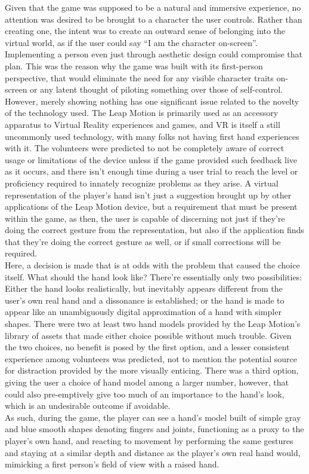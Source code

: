    Given that the game was supposed to be a natural and immersive experience, no attention was desired to be brought to a character the user controls. Rather than creating one, the intent was to create an outward sense of belonging into the virtual world, as if the user could say “I am the character on-screen”. Implementing a person even just through aesthetic design could compromise that plan. This was the reason why the game was built with its first-person perspective, that would eliminate the need for any visible character traits on-screen or any latent thought of piloting something over those of self-control.\\
    However, merely showing nothing has one significant issue related to the novelty of the technology used. The Leap Motion is primarily used as an accessory apparatus to Virtual Reality experiences and games, and VR is itself a still uncommonly used technology, with many folks not having first hand experiences with it. The volunteers were predicted to not be completely aware of correct usage or limitations of the device unless if the game provided such feedback live as it occurs, and there isn’t enough time during a user trial to reach the level or proficiency required to innately recognize problems as they arise. A virtual representation of the player’s hand isn’t just a suggestion brought up by other applications of the Leap Motion device, but a requirement that must be present within the game, as then, the user is capable of discerning not just if they’re doing the correct gesture from the representation, but also if the application finds that they’re doing the correct gesture as well, or if small corrections will be required.\\
    Here, a decision is made that is at odds with the problem that caused the choice itself. What should the hand look like? There’re essentially only two possibilities: Either the hand looks realistically, but inevitably appears different from the user’s own real hand and a dissonance is established; or the hand is made to appear like an unambiguously digital approximation of a hand with simpler shapes. There were two at least two hand models provided by the Leap Motion’s library of assets that made either choice possible without much trouble. Given the two choices, no benefit is posed by the first option, and a lesser consistent experience among volunteers was predicted, not to mention the potential source for distraction provided by the more visually enticing.  There was a third option, giving the user a choice of hand model among a larger number, however, that could also pre-emptively give too much of an importance to the hand’s look, which is an undesirable outcome if avoidable. \\
    As such, during the game, the player can see a hand’s model built of simple gray and blue smooth shapes denoting fingers and joints, functioning as a proxy to the player’s own hand, and reacting to movement by performing the same gestures and staying at a similar depth and distance as the player’s own real hand would, mimicking a first person’s field of view with a raised hand.\\

